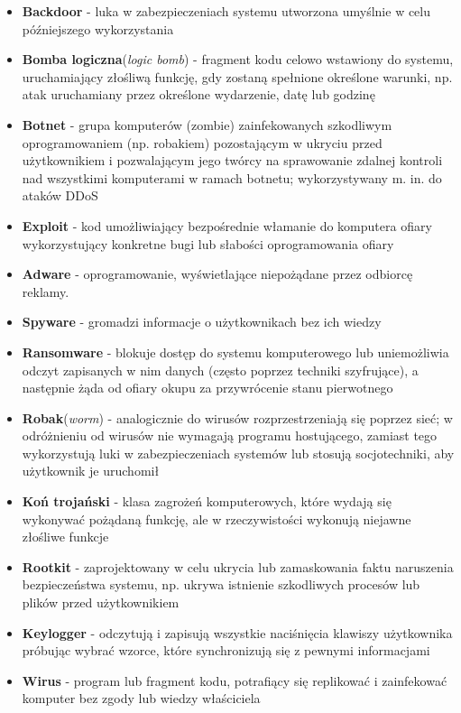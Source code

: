 \begin{itemize}
	\item \textbf{Backdoor} - luka w zabezpieczeniach systemu utworzona umyślnie w celu późniejszego wykorzystania 
	\item \textbf{Bomba logiczna}(\textit{logic bomb}) - fragment kodu celowo wstawiony do systemu, uruchamiający złośliwą funkcję, gdy zostaną spełnione określone warunki, np. atak uruchamiany przez określone wydarzenie, datę lub godzinę 
	\item \textbf{Botnet} - grupa komputerów (zombie) zainfekowanych szkodliwym oprogramowaniem (np. robakiem) pozostającym w ukryciu przed użytkownikiem i pozwalającym jego twórcy na sprawowanie zdalnej kontroli nad wszystkimi komputerami w ramach botnetu; wykorzystywany m. in. do ataków DDoS 
	\item \textbf{Exploit} - kod umożliwiający bezpośrednie włamanie do komputera ofiary wykorzystujący konkretne bugi lub słabości oprogramowania ofiary 
	\item \textbf{Adware} - oprogramowanie, wyświetlające niepożądane przez odbiorcę reklamy. 
	\item \textbf{Spyware} - gromadzi informacje o użytkownikach bez ich wiedzy 
	\item \textbf{Ransomware} - blokuje dostęp do systemu komputerowego lub uniemożliwia odczyt zapisanych w nim danych (często poprzez techniki szyfrujące), a następnie żąda od ofiary okupu za przywrócenie stanu pierwotnego 
	\item \textbf{Robak}(\textit{worm}) - analogicznie do wirusów rozprzestrzeniają się poprzez sieć; w odróżnieniu od wirusów nie wymagają programu hostującego, zamiast tego wykorzystują luki w zabezpieczeniach systemów lub stosują socjotechniki, aby użytkownik je uruchomił 
	\item \textbf{Koń trojański} - klasa zagrożeń komputerowych, które wydają się wykonywać pożądaną funkcję, ale w rzeczywistości wykonują niejawne złośliwe funkcje 
	\item \textbf{Rootkit} - zaprojektowany w celu ukrycia lub zamaskowania faktu naruszenia bezpieczeństwa systemu, np. ukrywa istnienie szkodliwych procesów lub plików przed użytkownikiem 
	\item \textbf{Keylogger} - odczytują i zapisują wszystkie naciśnięcia klawiszy użytkownika próbując wybrać wzorce, które synchronizują się z pewnymi informacjami 
	\item \textbf{Wirus} - program lub fragment kodu, potrafiący się replikować i zainfekować komputer bez zgody lub wiedzy właściciela 
\end{itemize}

